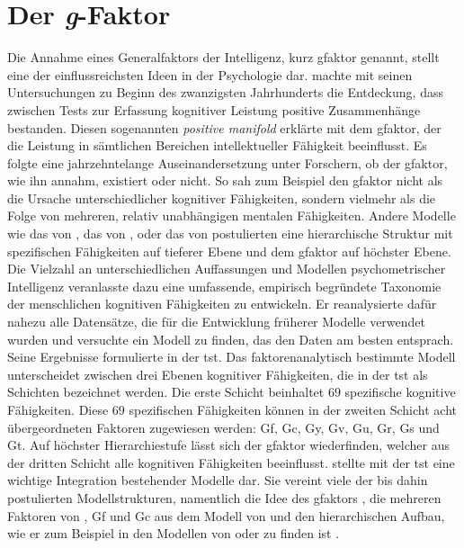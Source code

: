 \documentclass[11pt, twoside, a4paper]{book}		%
\begin{document}
\section{Der \textit{g}-Faktor}

Die Annahme eines Generalfaktors der Intelligenz, kurz \gls{gfaktor} genannt, stellt eine der einflussreichsten Ideen in der Psychologie dar. \citet{Spearman1904, Spearman1927} machte mit seinen Untersuchungen zu Beginn des zwanzigsten Jahrhunderts die Entdeckung, dass zwischen Tests zur Erfassung kognitiver Leistung positive Zusammenhänge bestanden. Diesen sogenannten \textit{positive man\-i\-fold} erklärte \citeauthor{Spearman1927} mit dem \gls{gfaktor}, der die Leistung in sämtlichen Bereichen intellektueller Fähigkeit beeinflusst. Es folgte eine jahrzehntelange Auseinandersetzung unter Forschern, ob der \gls{gfaktor}, wie ihn \citeauthor{Spearman1927} annahm, existiert oder nicht. So sah zum Beispiel \citet{Thurstone1938} den \gls{gfaktor} nicht als die Ursache unterschiedlicher kognitiver Fähigkeiten, sondern vielmehr als die Folge von mehreren, relativ unabhängigen mentalen Fähigkeiten. Andere Modelle wie das von \citet{Vernon1950}, das von \citet{Cattell1971}, oder das von \citet{Jaeger1984} postulierten eine hierarchische Struktur mit spezifischen Fähigkeiten auf tieferer Ebene und dem \gls{gfaktor} auf höchster Ebene. 
Die Vielzahl an unterschiedlichen Auffassungen und Modellen psychometrischer Intelligenz veranlasste \citet{Carroll1993} dazu eine umfassende, empirisch begründete Taxonomie der menschlichen kognitiven Fähigkeiten zu entwickeln. Er reanalysierte dafür nahezu alle Datensätze, die für die Entwicklung früherer Modelle verwendet wurden und versuchte ein Modell zu finden, das den Daten am besten entsprach. Seine Ergebnisse formulierte \citeauthor{Carroll1993} in der \gls{tst}.
Das faktorenanalytisch bestimmte Modell unterscheidet zwischen drei Ebenen kognitiver Fähigkeiten, die in der \gls{tst} als Schichten bezeichnet werden. Die erste Schicht beinhaltet $69$ spezifische kognitive Fähigkeiten. Diese $69$ spezifischen Fähigkeiten können in der zweiten Schicht acht übergeordneten Faktoren zugewiesen werden: \gls{Gf}, \gls{Gc}, \gls{Gy}, \gls{Gv}, \gls{Gu}, \gls{Gr}, \gls{Gs} und \gls{Gt}. 
Auf höchster Hierarchiestufe lässt sich der \gls{gfaktor} wiederfinden, welcher aus der dritten Schicht alle kognitiven Fähigkeiten beeinflusst.
\citeauthor{Carroll1993} stellte mit der \gls{tst} eine wichtige Integration bestehender Modelle dar. 
Sie vereint viele der bis dahin postulierten Modellstrukturen, namentlich die Idee des \gls{gfaktor}s \citep{Spearman1904, Spearman1927}, die mehreren Faktoren von \citet{Thurstone1938}, \gls{Gf} und \gls{Gc} aus dem Modell von \citet{Cattell1971} und den hierarchischen Aufbau, wie er zum Beispiel in den Modellen von \citet{Vernon1950} oder \citet{Jaeger1984} zu finden ist \citep[für Erweiterungen der \gls{tst} siehe][]{McGrew2005, McGrew2009}.
\end{document}
